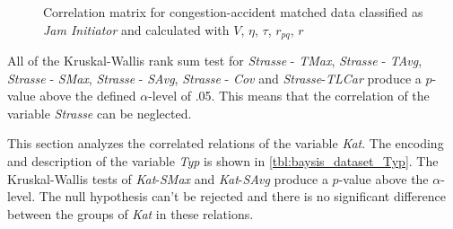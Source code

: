 \begin{figure}[!ht]
	\centering
	\caption{Correlation matrix for congestion-accident matched data classified as \textit{Jam Initiator} and calculated with $V$, $\eta$, $\tau$, $r_{pq}$, $r$}
	\label{img:correlation_matrix_selected_initiator_cramers}
\end{figure}

All of the Kruskal-Wallis rank sum test for \textit{Strasse} - \textit{TMax}, \textit{Strasse} - \textit{TAvg}, \textit{Strasse} - \textit{SMax}, \textit{Strasse} - \textit{SAvg}, \textit{Strasse} - \textit{Cov} and \textit{Strasse}-\textit{TLCar} produce a $p$-value above the defined $\alpha$-level of .05. This means that the correlation of the variable \textit{Strasse} can be neglected.

This section analyzes the correlated relations of the variable \textit{Kat}. The encoding and description of the variable \textit{Typ} is shown in \cref{tbl:baysis_dataset_Typ}. The Kruskal-Wallis tests of \textit{Kat}-\textit{SMax} and \textit{Kat}-\textit{SAvg} produce a $p$-value above the $\alpha$-level. The null hypothesis can't be rejected and there is no significant difference between the groups of \textit{Kat} in these relations.

